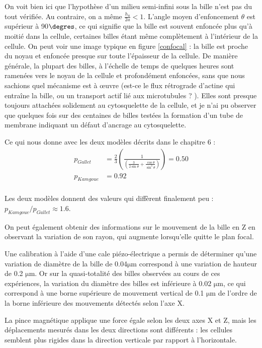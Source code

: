 \documentclass{report}
\newcommand{\micro}{$\mathrm{\mu}$}
\begin{document}
On voit bien ici que l'hypothèse d'un milieu semi-infini sous la bille n'est pas du tout vérifiée. Au contraire, on a même $\frac{h_u}{2a} <1$. L'angle moyen d'enfoncement $\theta$ est supérieur à 90$\degres$, ce qui signifie que la bille est souvent enfoncée plus qu'à moitié dans la cellule, certaines billes étant même complètement à l'intérieur de la cellule. On peut voir une image typique en figure \ref{confocal} : la bille est proche du noyau et enfoncée presque sur toute l'épaisseur de la cellule. 
De manière générale, la plupart des billes, à l'échelle de temps de quelques heures sont ramenées vers le noyau de la cellule et profondément enfoncées, sans que nous sachions quel mécanisme est à \oe uvre (est-ce le flux rétrograde d'actine qui entraîne la bille, ou un transport actif lié aux microtubules ? ). Elles sont presque toujours attachées solidement au cytosquelette de la cellule, et je n'ai pu observer que quelques fois sur des centaines de billes testées la formation d'un tube de membrane indiquant un défaut d'ancrage au cytosquelette. 

Ce qui nous donne avec les deux modèles décrits dans le chapitre 6 : 
\begin{align}
 p_{Gallet}&=\frac{2}{3}\left(\frac{1}{\left( \frac{3}{2 \sin \theta}+\frac{\cos \theta}{\sin^3 \theta}\right)} \right) = 0.50 \\
p_{Kamgoue}&= 0.92\\
\end{align}

Les deux modèles donnent des valeurs qui diffèrent finalement peu : $ p_{Kamgoue} / p_{Gallet} \approx 1.6$.

On peut également obtenir des informations sur le mouvement de la bille en Z en observant la variation de son rayon, qui augmente lorsqu'elle quitte le plan focal. 

Une calibration à l'aide d'une cale piézo-électrique a permis de déterminer qu'une variation de diamètre de la bille de 0.04\micro m correspond à une variation de hauteur de 0.2 \micro m. 
Or sur la quasi-totalité des billes observées au cours de ces expériences, la variation du diamètre des billes est inférieure à 0.02 \micro m, ce qui correspond à une borne supérieure de mouvement vertical de 0.1 \micro m de l'ordre de la borne inférieure des mouvements détectés selon l'axe X. 

La pince magnétique applique une force égale selon les deux axes X et Z, mais les déplacements mesurés dans les deux directions sont différents : les cellules semblent plus rigides dans la direction verticale par rapport à l'horizontale. 
\end{document}
